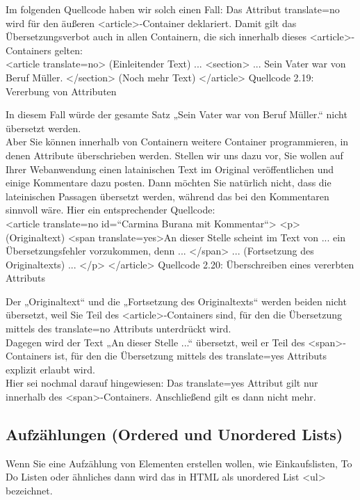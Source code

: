 Im folgenden Quellcode haben wir solch einen Fall: Das Attribut translate=no wird für den äußeren <article>-Container deklariert. Damit gilt das Übersetzungsverbot auch in allen Containern, die sich innerhalb dieses <article>-Containers gelten:\\

<article translate=no>
(Einleitender Text) ...
<section> ... Sein Vater war von Beruf Müller.
</section>
(Noch mehr Text)
</article>
Quellcode 2.19: Vererbung von Attributen

In diesem Fall würde der gesamte Satz „Sein Vater war von Beruf Müller.“ nicht übersetzt werden.\\

Aber Sie können innerhalb von Containern weitere Container programmieren, in denen Attribute überschrieben werden. Stellen wir uns dazu vor, Sie wollen auf Ihrer Webanwendung einen latainischen Text im Original veröffentlichen und einige Kommentare dazu posten. Dann möchten Sie natürlich nicht, dass die lateinischen Passagen übersetzt werden, während das bei den Kommentaren sinnvoll wäre. Hier ein entsprechender Quellcode:\\

<article translate=no id=“Carmina Burana mit Kommentar“>
<p> (Originaltext) <span translate=yes>An dieser Stelle scheint im Text von ... ein Übersetzungsfehler vorzukommen, denn ... </span> ... (Fortsetzung des Originaltexts) ... </p>
</article>
Quellcode 2.20: Überschreiben eines vererbten Attributs

Der „Originaltext“ und die „Fortsetzung des Originaltexts“ werden beiden nicht übersetzt, weil Sie Teil des <article>-Containers sind, für den die Übersetzung mittels des translate=no Attributs unterdrückt wird.\\

Dagegen wird der Text „An dieser Stelle ...“ übersetzt, weil er Teil des <span>-Containers ist, für den die Übersetzung mittels des translate=yes Attributs explizit erlaubt wird.\\

Hier sei nochmal darauf hingewiesen: Das translate=yes Attribut gilt nur innerhalb des <span>-Containers. Anschließend gilt es dann nicht mehr. 

\subsection{Aufzählungen (Ordered und Unordered Lists)}

Wenn Sie eine Aufzählung von Elementen erstellen wollen, wie Einkaufslisten, To Do Listen oder ähnliches dann wird das in HTML als unordered List <ul> bezeichnet. \\

